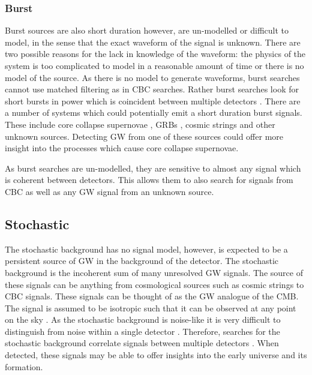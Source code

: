 \subsubsection{\label{sources:transient:burst}Burst}

Burst sources are also short duration however, are un-modelled or difficult to model, in the sense that the exact waveform of the signal is unknown.
There are two possible reasons for the lack in knowledge of the waveform: the physics of the system is too complicated to model in a reasonable amount of time or there is no model of the source.
As there is no model to generate waveforms, burst searches cannot use matched filtering as in \gls{CBC} searches.
Rather burst searches look for short bursts in power which is coincident between multiple detectors \citep{cornish2015BayeswaveBayesian, klimenko2008CoherentMethod}.
There are a number of systems which could potentially emit a short duration burst signals.
These include core collapse supernovae \citep{ott2008GravitationalWave}, \glspl{GRB} \citep{aasi2014SearchGravitational}, cosmic strings \citep{damour2005GravitationalRadiation} and other unknown sources.
Detecting \gls{GW} from one of these sources could offer more insight into the processes which cause core collapse supernovae. 

As burst searches are un-modelled, they are sensitive to almost any signal which is coherent between detectors. 
This allows them to also search for signals from \gls{CBC} as well as any \gls{GW} signal from an unknown source.



\subsection{Stochastic}

The stochastic background has no signal model, however, is expected to be a persistent source of \gls{GW} in the background of the detector. 
The stochastic background is the incoherent sum of many unresolved \gls{GW} signals.
The source of these signals can be anything from cosmological sources such as cosmic strings to \gls{CBC} signals.
These signals can be thought of as the \gls{GW} analogue of the \gls{CMB}.
The signal is assumed to be isotropic such that it can be observed at any point on the sky \citep{christensen2018StochasticGravitational}. 
As the stochastic background is noise-like it is very difficult to distinguish from noise within a single detector \citep{christensen2018StochasticGravitational}.
Therefore, searches for the stochastic background correlate signals between multiple detectors \citep{romano2019SearchesStochastic,christensen2018StochasticGravitational}. 
When detected, these signals may be able to offer insights into the early universe and its formation.




